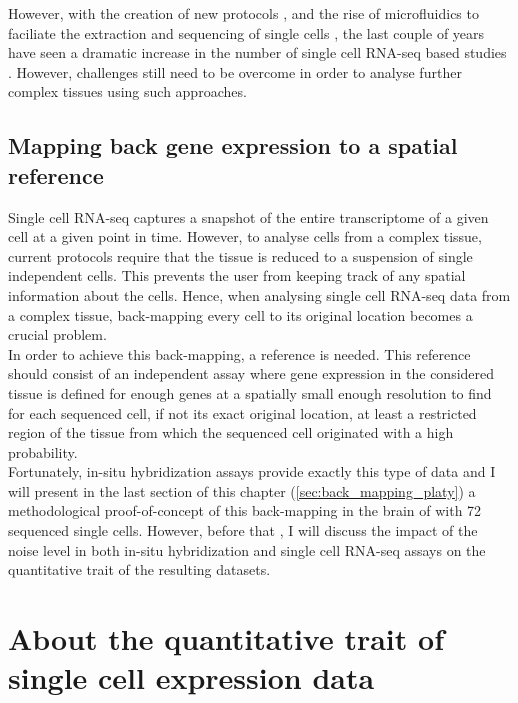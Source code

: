 	However, with the creation of new protocols \cite{ramskold12,tang09}, and the rise of microfluidics to faciliate the extraction and sequencing of single cells \cite{ozsolak10}, the last couple of years have seen a dramatic increase in the number of single cell RNA-seq based studies \cite{islam13,marinov13,yan13,staahlberg13,deng14}. However, challenges still need to be overcome in order to analyse further complex tissues using such approaches.

  \subsection{Mapping back gene expression to a spatial reference}

	Single cell RNA-seq captures a snapshot of the entire transcriptome of a given cell at a given point in time. However, to analyse cells from a complex tissue, current protocols require that the tissue is reduced to a suspension of single independent cells. This prevents the user from keeping track of any spatial information about the cells. Hence, when analysing single cell RNA-seq data from a complex tissue, back-mapping every cell to its original location becomes a crucial problem.\\ 
	
	In order to achieve this back-mapping, a reference is needed. This reference should consist of an independent assay where gene expression in the considered tissue is defined for enough genes at a spatially small enough resolution to find for each sequenced cell, if not its exact original location, at least a restricted region of the tissue from which the sequenced cell originated with a high probability.\\
	
	Fortunately, in-situ hybridization assays provide exactly this type of data and I will present in the last section of this chapter (\ref{sec:back_mapping_platy}) a methodological proof-of-concept of this back-mapping in the brain of \platy{} with 72 sequenced single cells. However, before that , I will discuss the impact of the noise level in both in-situ hybridization and single cell RNA-seq assays on the quantitative trait of the resulting datasets.

\section{About the quantitative trait of single cell expression data}\label{sec:quantitative_single_cell}
